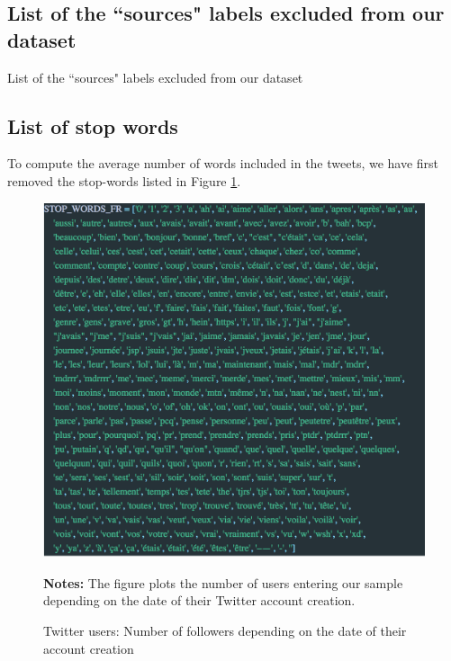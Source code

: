 \subsection{List of the ``sources" labels excluded from our dataset} \label{Appendix:Bots}
\begin{table}[H]
    \centering
    \resizebox*{!}{\dimexpr\textheight-1\baselineskip\relax}{
    
    }
    \caption{List of the ``sources" labels excluded from our dataset}
    \label{tab:botlist}
\end{table}


\subsection{List of stop words}
\label{Appendix:StopWords}
To compute the average number of words included in the tweets, we have first removed the stop-words listed in Figure \ref{fig:stop_words}.

\begin{figure}
\begin{center}
\includegraphics[scale=.7]{figures/stop_words.png}
\end{center}
	\begin{spacing}{0.5}
		{\footnotesize \textbf{Notes:} The figure plots the number of users entering our sample depending on the date of their Twitter account creation.}
	\end{spacing}
\vspace{.5cm}	
	\caption{Twitter users: Number of followers depending on the date of their account creation}
	\label{fig:stop_words}
\end{figure}


